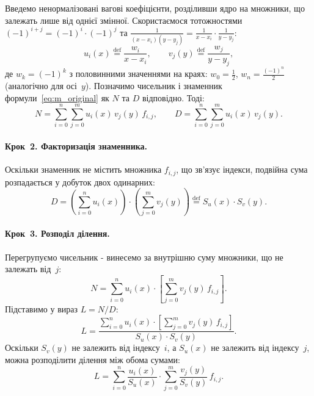 Введемо ненормалізовані вагові коефіцієнти, розділивши ядро на множники, що залежать лише від однієї змінної. Скористаємося тотожностями $(-1)^{i+j} = (-1)^i \cdot (-1)^j$ та $\frac{1}{(x-x_i)(y-y_j)} = \frac{1}{x-x_i} \cdot \frac{1}{y-y_j}$:
\begin{equation}\label{eq:m_uv}
	u_i(x) \stackrel{\text{def}}{=} \frac{w_i}{x - x_i}, \qquad
	v_j(y) \stackrel{\text{def}}{=} \frac{w_j}{y - y_j},
\end{equation}
де $w_k = (-1)^k$ з половинними значеннями на краях: $w_0 = \tfrac{1}{2}$, $w_n = \tfrac{(-1)^n}{2}$ (аналогічно для осі~$y$). Позначимо чисельник і знаменник формули~\eqref{eq:m_original} як $N$ та $D$ відповідно. Тоді:
\begin{equation}\label{eq:m_ND}
	N = \sum\limits_{i=0}^{n}\sum\limits_{j=0}^{m} u_i(x)\, v_j(y)\, f_{i,j}, \qquad
	D = \sum\limits_{i=0}^{n}\sum\limits_{j=0}^{m} u_i(x)\, v_j(y).
\end{equation}

\paragraph{Крок~2. Факторизація знаменника.}
Оскільки знаменник не містить множника $f_{i,j}$, що зв'язує індекси, подвійна сума розпадається у добуток двох одинарних:
\begin{equation}\label{eq:m_D_factor}
	D = \left(\sum\limits_{i=0}^{n} u_i(x)\right) \cdot \left(\sum\limits_{j=0}^{m} v_j(y)\right)
	\stackrel{\text{def}}{=} S_u(x) \cdot S_v(y).
\end{equation}

\paragraph{Крок~3. Розподіл ділення.}
Перегрупуємо чисельник - винесемо за внутрішню суму множники, що не залежать від~$j$:
\begin{equation}\label{eq:m_N_regroup}
	N = \sum\limits_{i=0}^{n} u_i(x) \cdot \left[\sum\limits_{j=0}^{m} v_j(y)\, f_{i,j}\right].
\end{equation}
Підставимо у вираз $L = N/D$:
\begin{equation}\label{eq:m_L_step}
	L = \frac{
		\sum\limits_{i=0}^{n} u_i(x) \cdot
		\left[\sum\limits_{j=0}^{m} v_j(y)\, f_{i,j}\right]
	}{S_u(x) \cdot S_v(y)}.
\end{equation}
Оскільки $S_v(y)$ не залежить від індексу~$i$, а $S_u(x)$ не залежить від індексу~$j$, можна розподілити ділення між обома сумами:
\begin{equation}\label{eq:m_L_distributed}
	L = \sum\limits_{i=0}^{n} \frac{u_i(x)}{S_u(x)} \cdot \sum\limits_{j=0}^{m} \frac{v_j(y)}{S_v(y)}\, f_{i,j}.
\end{equation}

